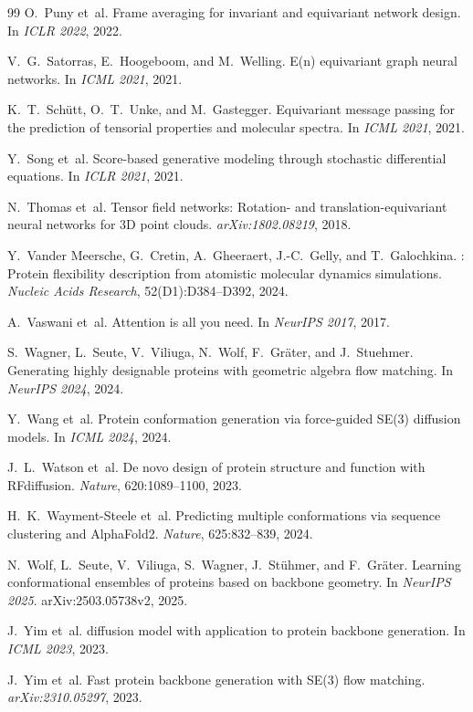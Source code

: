 \documentclass[12pt,a4paper]{article}
\begin{document}
\begin{thebibliography}{99}
O.\ Puny et~al.
\newblock Frame averaging for invariant and equivariant network design.
\newblock In \emph{ICLR 2022}, 2022.

V.\ G.\ Satorras, E.\ Hoogeboom, and M.\ Welling.
\newblock E(n) equivariant graph neural networks.
\newblock In \emph{ICML 2021}, 2021.

K.\ T.\ Sch\"{u}tt, O.\ T.\ Unke, and M.\ Gastegger.
\newblock Equivariant message passing for the prediction of tensorial properties and molecular spectra.
\newblock In \emph{ICML 2021}, 2021.

Y.\ Song et~al.
\newblock Score-based generative modeling through stochastic differential equations.
\newblock In \emph{ICLR 2021}, 2021.

N.\ Thomas et~al.
\newblock Tensor field networks: Rotation- and translation-equivariant neural networks for 3D point clouds.
\newblock \emph{arXiv:1802.08219}, 2018.

Y.\ Vander Meersche, G.\ Cretin, A.\ Gheeraert, J.-C.\ Gelly, and T.\ Galochkina.
: Protein flexibility description from atomistic molecular dynamics simulations.
\newblock \emph{Nucleic Acids Research}, 52(D1):D384--D392, 2024.

A.\ Vaswani et~al.
\newblock Attention is all you need.
\newblock In \emph{NeurIPS 2017}, 2017.

S.\ Wagner, L.\ Seute, V.\ Viliuga, N.\ Wolf, F.\ Gr\"{a}ter, and J.\ Stuehmer.
\newblock Generating highly designable proteins with geometric algebra flow matching.
\newblock In \emph{NeurIPS 2024}, 2024.

Y.\ Wang et~al.
\newblock Protein conformation generation via force-guided {SE(3)} diffusion models.
\newblock In \emph{ICML 2024}, 2024.

J.\ L.\ Watson et~al.
\newblock De novo design of protein structure and function with {RFdiffusion}.
\newblock \emph{Nature}, 620:1089--1100, 2023.

H.\ K.\ Wayment-Steele et~al.
\newblock Predicting multiple conformations via sequence clustering and {AlphaFold2}.
\newblock \emph{Nature}, 625:832--839, 2024.

N.\ Wolf, L.\ Seute, V.\ Viliuga, S.\ Wagner, J.\ St\"{u}hmer, and F.\ Gr\"{a}ter.
\newblock Learning conformational ensembles of proteins based on backbone geometry.
\newblock In \emph{NeurIPS 2025}. arXiv:2503.05738v2, 2025.

J.\ Yim et~al.
 diffusion model with application to protein backbone generation.
\newblock In \emph{ICML 2023}, 2023.

J.\ Yim et~al.
\newblock Fast protein backbone generation with {SE(3)} flow matching.
\newblock \emph{arXiv:2310.05297}, 2023.

\end{thebibliography}
\end{document}
